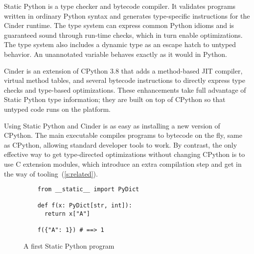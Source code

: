 \documentclass[english,cleveref,submission]{programming}
\newcommand{\SP}{Static Python}
\begin{document}
\SP{} is a type checker and bytecode compiler.
It validates programs written in ordinary Python syntax
and generates type-specific instructions for the Cinder runtime.
The type system can express common Python idioms and is guaranteed
sound through run-time checks, which in turn enable optimizations.
The type system also includes a dynamic type as an escape hatch to
untyped behavior.
An unannotated variable behaves exactly as it would in Python.

Cinder is an extension of CPython 3.8 that adds a method-based
JIT compiler, virtual method tables, and several bytecode instructions
to directly express type checks and type-based optimizations.
These enhancements take full advantage of \SP{} type information;
they are built on top of CPython so that untyped code runs on
the platform.

Using \SP{} and Cinder is as easy as installing a new version
of CPython.
The main executable compiles programs to bytecode on the fly,
same as CPython, allowing standard developer tools to work.
By contrast, the only effective way to get type-directed optimizations
without changing CPython is to use C extension modules,
which introduce an extra compilation step and get in the way
of tooling~(\cref{s:related}).

\begin{figure}
  \begin{verbatim}
    from __static__ import PyDict

    def f(x: PyDict[str, int]):
      return x["A"]

    f({"A": 1}) # ==> 1
  \end{verbatim}
%
%
%
%
  \caption{A first \SP{} program}
  \label{fig:sp-example}
\end{figure}
\end{document}

